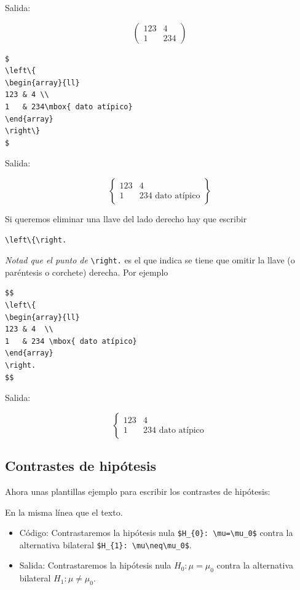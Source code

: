 \documentclass[]{article}
\begin{document}
Salida:

\[
\left(
\begin{array}{ll}
123 & 4 \\
1   & 234
\end{array}
\right)
\]

\begin{verbatim}
$
\left\{
\begin{array}{ll}
123 & 4 \\
1   & 234\mbox{ dato atípico}
\end{array}
\right\}
$
\end{verbatim}

Salida:

\[
\left\{
\begin{array}{ll}
123 & 4  \\
1   & 234 \mbox{ dato atípico}
\end{array}
\right\}
\]

Si queremos eliminar una llave del lado derecho hay que escribir

\begin{verbatim}
\left\{\right.
\end{verbatim}

\emph{Notad que el punto de} \texttt{\textbackslash{}right.} es el que
indica se tiene que omitir la llave (o paréntesis o corchete) derecha.
Por ejemplo

\begin{verbatim}
$$
\left\{
\begin{array}{ll}
123 & 4  \\
1   & 234 \mbox{ dato atípico}
\end{array}
\right.
$$
\end{verbatim}

Salida:

\[
\left\{
\begin{array}{ll}
123 & 4  \\
1   & 234 \mbox{ dato atípico}
\end{array}
\right.
\]

\subsection{Contrastes de hipótesis }\label{contrastes-de-hipotesis}

Ahora unas plantillas ejemplo para escribir los contrastes de hipótesis:

En la misma línea que el texto.

\begin{itemize}
\item
  Código: Contrastaremos la hipótesis nula
  \texttt{\$H\_\{0\}: \textbackslash{}mu=\textbackslash{}mu\_0\$} contra
  la alternativa bilateral
  \texttt{\$H\_\{1\}: \textbackslash{}mu\textbackslash{}neq\textbackslash{}mu\_0\$}.
\item
  Salida: Contrastaremos la hipótesis nula $H_{0}: \mu=\mu_0$ contra la
  alternativa bilateral $H_{1}: \mu\neq\mu_0$.
\end{itemize}
\end{document}
